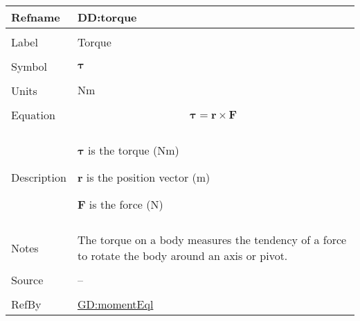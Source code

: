 \documentclass[12pt]{article}
\begin{document}
\vspace{\baselineskip}
\noindent
\begin{minipage}{\textwidth}
\begin{tabular}{>{\raggedright}p{}>{\raggedright\arraybackslash}p{}}
\toprule \textbf{Refname} & \textbf{DD:torque}
\label{DD:torque}
\\ \midrule \\
Label & Torque
        
\\ \midrule \\
Symbol & $\symbf{τ}$
         
\\ \midrule \\
Units & $\text{N}\text{m}$
        
\\ \midrule \\
Equation & \begin{displaymath}
           \symbf{τ}=\symbf{r}\times\symbf{F}
           \end{displaymath}
\\ \midrule \\
Description & \begin{symbDescription}
              \item{$\symbf{τ}$ is the torque ($\text{N}\text{m}$)}
              \item{$\symbf{r}$ is the position vector (${\text{m}}$)}
              \item{$\symbf{F}$ is the force (${\text{N}}$)}
              \end{symbDescription}
\\ \midrule \\
Notes & The torque on a body measures the tendency of a force to rotate the body around an axis or pivot.
        
\\ \midrule \\
Source & --
         
\\ \midrule \\
RefBy & \hyperref[GD:momentEql]{GD:momentEql}
        
\\ \bottomrule
\end{tabular}
\end{minipage}
\end{document}
